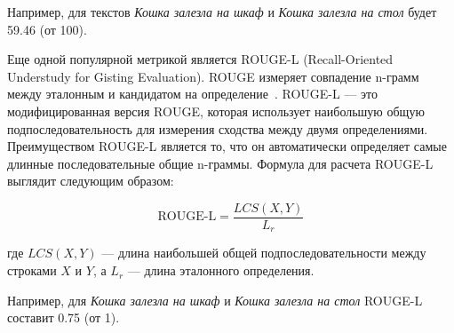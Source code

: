 \documentclass[LI,VKR]{HSEUniversity}
\begin{document}
Например, для текстов \textit{Кошка залезла на шкаф} и \textit{Кошка залезла на стол} будет 59.46 (от 100).

%
%
%
%
%
%
%
%
%
%
%


Еще одной популярной метрикой является ROUGE-L (Recall-Oriented Understudy for Gisting Evaluation).
ROUGE измеряет совпадение n-грамм между эталонным и кандидатом на определение~\cite{ROUGE}.
ROUGE-L — это модифицированная версия ROUGE, которая использует наибольшую общую подпоследовательность
для измерения сходства между двумя определениями.
Преимуществом ROUGE-L является то, что он автоматически определяет самые длинные последовательные общие n-граммы.
Формула для расчета ROUGE-L выглядит следующим образом:

\begin{equation}
\text{ROUGE-L} = \frac{LCS(X, Y)}{L_r}
\end{equation}

где $LCS(X, Y)$ — длина наибольшей общей подпоследовательности между строками $X$ и $Y$, а $L_r$ — длина эталонного определения.

Например, для \textit{Кошка залезла на шкаф} и \textit{Кошка залезла на стол} ROUGE-L составит 0.75 (от 1).
\end{document}

